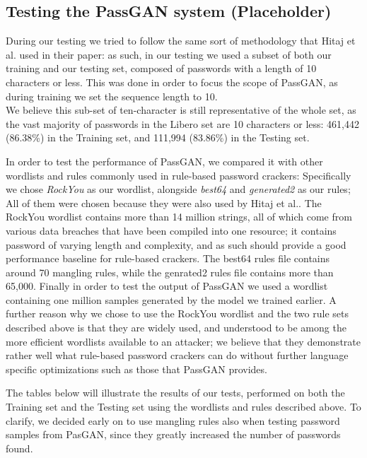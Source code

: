 \subsection{Testing the PassGAN system (Placeholder)}
During our testing we tried to follow the same sort of methodology that Hitaj et al.\cite{PassGAN} used in their paper: as such, in our testing we used a subset of both our training  and our testing set, composed of passwords with a length of 10 characters or less. This was done in order to focus the scope of PassGAN, as during training we set the sequence length to 10.\\ %
We believe this sub-set of ten-character is still representative of the whole set, as the vast majority of passwords in the Libero set are 10 characters or less: 461,442 (86.38\%) in the Training set, and 111,994 (83.86\%) in the Testing set. 

In order to test the performance of PassGAN, we compared it with other wordlists and rules commonly used in rule-based password crackers: Specifically we chose \emph{RockYou} as our wordlist, alongside \emph{best64} and \emph{generated2} as our rules; All of them were chosen because they were also used by Hitaj et al.\cite{PassGAN}.
The RockYou wordlist contains more than 14 million strings, all of which come from various data breaches that have been compiled into one resource; it contains password of varying length and complexity, and as such should provide a good performance baseline for rule-based crackers. The best64 rules file contains around 70 mangling rules, while the genrated2 rules file contains more than 65,000. 
Finally in order to test the output of PassGAN we used a wordlist containing one million samples generated by the model we trained earlier.
A further reason why we chose to use the RockYou wordlist and the two rule sets described above is that they are widely used, and understood to be among the more efficient wordlists available to an attacker; we believe that they demonstrate rather well what rule-based password crackers can do without further language specific optimizations such as those that PassGAN provides.

The tables below will illustrate the results of our tests, performed on both the Training set and the Testing set using the wordlists and rules described above. To clarify, we decided early on to use mangling rules also when testing password samples from PasGAN, since they greatly increased the number of passwords found. 

